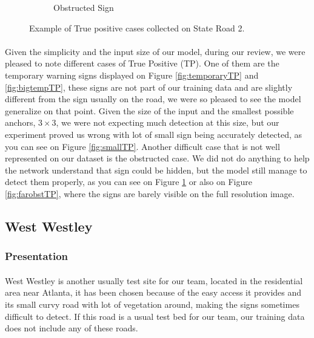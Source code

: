 \begin{figure}
\begin{center}
\begin{subfigure}[t]{.49\linewidth}
      \caption{Obstructed Sign}
      \label{fig:obstTP}
    \end{subfigure}
    \caption{Example of True positive cases collected on State Road 2.}
    \label{fig:TPcases}
  \end{center}
\end{figure}

\paragraph{}
Given the simplicity and the input size of our model, during our review, we were pleased to note different cases of True Positive (TP). One of them are the temporary warning signs displayed on Figure \ref{fig:temporaryTP} and \ref{fig:bigtempTP}, these signs are not part of our training data and are slightly different from the sign usually on the road, we were so pleased to see the model generalize on that point. Given the size of the input and the smallest possible anchors, $3\times3$, we were not expecting much detection at this size, but our experiment proved us wrong with lot of small sign being accurately detected, as you can see on Figure \ref{fig:smallTP}. Another difficult case that is not well represented on our dataset is the obstructed case. We did not do anything to help the network understand that sign could be hidden, but the model still manage to detect them properly, as you can see on Figure \ref{fig:obstTP} or also on Figure \ref{fig:farobstTP}, where the signs are barely visible on the full resolution image.

\subsection{West Westley}
\subsubsection{Presentation}
\paragraph{}
West Westley is another usually test site for our team, located in the residential area near Atlanta, it has been chosen because of the easy access it provides and its small curvy road with lot of vegetation around, making the signs sometimes difficult to detect. If this road is a usual test bed for our team, our training data does not include any of these roads.

